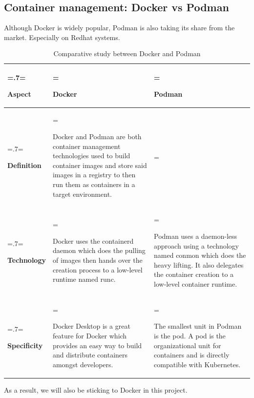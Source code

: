 \subsection{Container management: Docker vs Podman}
Although Docker is widely popular, Podman is also taking its share from the market. Especially on Redhat systems.
\begin{table}[H]
	\renewcommand{\arraystretch}{1.5}%
	\caption{Comparative study between Docker and Podman}
	\centering
	\medskip
	\begin{tabularx}{1\textwidth} {
			| >{\hsize=.7\hsize\linewidth=\hsize\raggedright\arraybackslash}X
			| >{\hsize=1.15\hsize\linewidth=\hsize\raggedright\arraybackslash}X
			| >{\hsize=1.15\hsize\linewidth=\hsize\raggedright\arraybackslash}X |}
		\hline
		\rowcolor{primary} \textbf {Aspect} & \textbf {Docker}                                                                                                                                                                                                                    & \textbf {Podman}                                                                                                                                                            \\
		\hline
		\textbf {Definition}                & \multicolumn{2}{|>{\hsize=2.35\hsize}X|} {Docker and Podman are both  container management technologies used to build container images and store said images in a registry to then run them as containers in a target environment.}                                                                                                                                                                               \\
		\hline
		\textbf {Technology}                & Docker uses the containerd daemon which does the pulling of images then hands over the creation process to a low-level runtime named runc.                                                                                          & Podman uses a daemon-less approach using a technology named conmon which does the heavy lifting. It also delegates the container creation to a low-level container runtime. \\
		\hline
		\textbf {Specificity}               & Docker Desktop is a great feature for Docker which provides an easy way to build and distribute containers amongst developers.                                                                                                      & The smallest unit in Podman is the pod. A pod is the organizational unit for containers and is directly compatible with Kubernetes.                                         \\
		\hline
	\end{tabularx}
\end{table}
As a result, we will also be sticking to Docker in this project.

